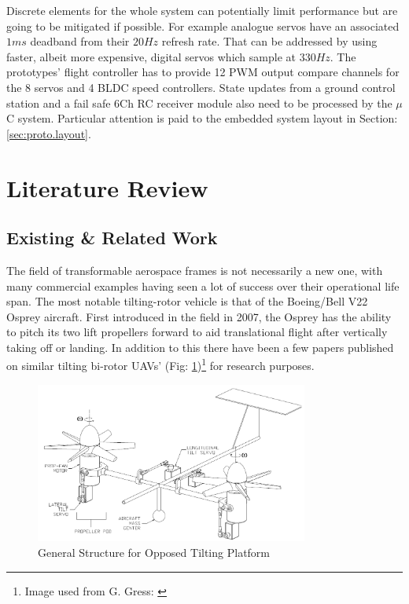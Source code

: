 \par
Discrete elements for the whole system can potentially limit performance but are going to be mitigated if possible. For example analogue servos have an associated $1 ms$ deadband from their $20 Hz$ refresh rate. That can be addressed by using faster, albeit more expensive, digital servos which sample at $330 Hz$. The prototypes' flight controller has to provide 12 PWM output compare channels for the 8 servos and 4 BLDC speed controllers. State updates from a ground control station and a fail safe 6Ch RC receiver module also need to be processed by the $\mu$C system. Particular attention is paid to the embedded system layout in Section:\ref{sec:proto.layout}.
\section{Literature Review}
\label{sec:intro.litreview}
\subsection{Existing \& Related Work}
\label{subsec:intro.lit.related}
The field of transformable aerospace frames is not necessarily a new one, with many commercial examples having seen a lot of success over their operational life span. The most notable tilting-rotor vehicle is that of the Boeing/Bell V22 Osprey aircraft. First introduced in the field in 2007, the Osprey has the ability to pitch its two lift propellers forward to aid translational flight after vertically taking off or landing. In addition to this there have been a few papers published on similar tilting bi-rotor UAVs' (Fig: \ref{fig:dualaxistilt})\footnote{Image used from G. Gress: \cite{gres2007}} for research purposes.
\begin{figure}[hbtp]
\centering
\includegraphics[width=0.8\textwidth]{figs/dualaxistilt}
\caption{General Structure for Opposed Tilting Platform}
\label{fig:dualaxistilt}
\end{figure}
